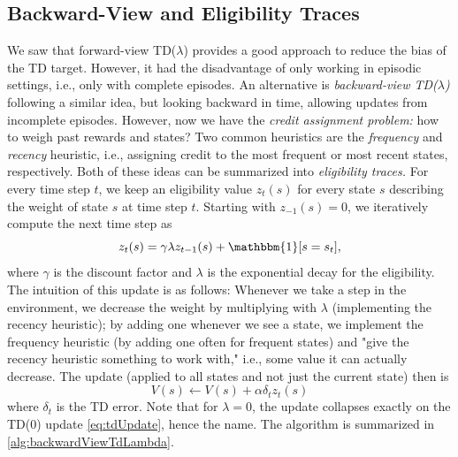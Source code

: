 		\subsection{Backward-View and Eligibility Traces}
			We saw that forward-view TD(\(\lambda\)) provides a good approach to reduce the bias of the \ac{TD} target. However, it had the disadvantage of only working in episodic settings, i.e., only with complete episodes. An alternative is \emph{backward-view TD(\(\lambda\))} following a similar idea, but looking backward in time, allowing updates from incomplete episodes. However, now we have the \emph{credit assignment problem:} how to weigh past rewards and states? Two common heuristics are the \emph{frequency} and \emph{recency} heuristic, i.e., assigning credit to the most frequent or most recent states, respectively. Both of these ideas can be summarized into \emph{eligibility traces.} For every time step \(t\), we keep an eligibility value \( z_t(s) \) for every state \(s\) describing the weight of state \(s\) at time step \(t\). Starting with \( z_{-1}(s) = 0 \), we iteratively compute the next time step as
			\begin{equation}
				z_t(s) = \gamma \lambda z_{t - 1}(s) + \mathbbm{1}[s = s_t],
			\end{equation}
			where \(\gamma\) is the discount factor and \(\lambda\) is the exponential decay for the eligibility. The intuition of this update is as follows: Whenever we take a step in the environment, we decrease the weight by multiplying with \(\lambda\) (implementing the recency heuristic); by adding one whenever we see a state, we implement the frequency heuristic (by adding one often for frequent states) and "give the recency heuristic something to work with," i.e., some value it can actually decrease. The update (applied to all states and not just the current state) then is
			\begin{equation}
				V(s) \gets V(s) + \alpha \delta_t z_t(s)
			\end{equation}
			where \(\delta_t\) is the \ac{TD} error. Note that for \(\lambda = 0\), the update collapses exactly on the TD(\(0\)) update \eqref{eq:tdUpdate}, hence the name. The algorithm is summarized in \autoref{alg:backwardViewTdLambda}.


